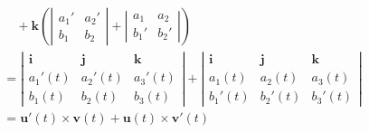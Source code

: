 \begin{align*}
    &\quad +\bm{k}\left(\left|\begin{array}{cc}
  	a_1' & a_2'\\
  	b_1 & b_2
    \end{array}\right|
    +\left|\begin{array}{cc}
  	a_1 & a_2\\
  	b_1' & b_2'
    \end{array}\right|\right)\\
    &=\left|\begin{array}{ccc}
	\bm{i} & \bm{j} & \bm{k}\\
  	a_1'(t) & a_2'(t) & a_3'(t)\\
  	b_1(t) & b_2(t) & b_3(t)
  	\end{array}\right|
  	+\left|\begin{array}{ccc}
	\bm{i} & \bm{j} & \bm{k}\\
  	a_1(t) & a_2(t) & a_3(t)\\
  	b_1'(t) & b_2'(t) & b_3'(t)
  	\end{array}\right|\\
  	&=\bm{u}'(t)\times\bm{v}(t)+\bm{u}(t)\times\bm{v}'(t)
\end{align*}

